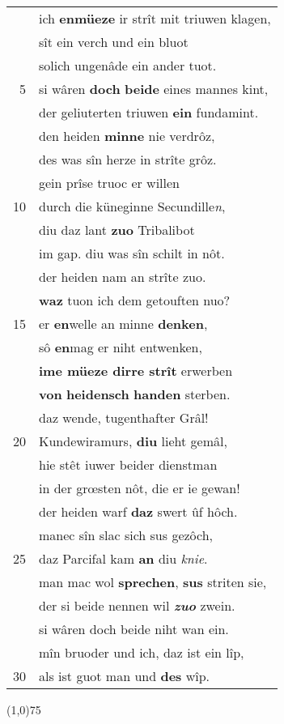 \documentclass[8pt,a4paper,notitlepage]{article}
\begin{document}
\begin{table}[ht]
\begin{minipage}[t]{0.5\linewidth}
\begin{tabular}{rl}
 & ich \textbf{en}\textbf{müeze} ir strît mit triuwen klagen,\\ 
 & sît ein verch und ein bluot\\ 
 & solich ungenâde ein ander tuot.\\ 
5 & si wâren \textbf{doch} \textbf{beide} eines mannes kint,\\ 
 & der geliuterten triuwen \textbf{ein} fundamint.\\ 
 & den heiden \textbf{minne} nie verdrôz,\\ 
 & des was sîn herze in strîte grôz.\\ 
 & gein prîse truoc er willen\\ 
10 & durch die küneginne Secundille\textit{n},\\ 
 & diu daz lant \textbf{zuo} Tribalibot\\ 
 & im gap. diu was sîn schilt in nôt.\\ 
 & der heiden nam an strîte zuo.\\ 
 & \textbf{waz} tuon ich dem getouften nuo?\\ 
15 & er \textbf{en}welle an minne \textbf{denken},\\ 
 & sô \textbf{en}mag er niht entwenken,\\ 
 & \textbf{ime müeze dirre strît} erwerben\\ 
 & \textbf{von} \textbf{heidensch} \textbf{handen} sterben.\\ 
 & daz wende, tugenthafter Grâl!\\ 
20 & Kundewiramurs, \textbf{diu} lieht gemâl,\\ 
 & hie stêt iuwer beider dienstman\\ 
 & in der grœsten nôt, die er ie gewan!\\ 
 & der heiden warf \textbf{daz} swert ûf hôch.\\ 
 & manec sîn slac sich sus gezôch,\\ 
25 & daz Parcifal kam \textbf{an} diu \textit{knie}.\\ 
 & man mac wol \textbf{sprechen}, \textbf{sus} striten sie,\\ 
 & der si beide nennen wil \textbf{\textit{zuo}} zwein.\\ 
 & si wâren doch beide niht wan ein.\\ 
 & mîn bruoder und ich, daz ist ein lîp,\\ 
30 & als ist guot man und \textbf{des} wîp.\\ 
\end{tabular}
\scriptsize
\line(1,0){75} \newline

\end{minipage}
\end{table}
\end{document}
